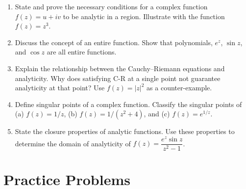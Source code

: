 \documentclass[12pt,a4paper]{article}
\begin{document}
\begin{enumerate}
  \item State and prove the necessary conditions for a complex function
        $f(z) = u + iv$ to be analytic in a region. Illustrate with the function
        $f(z) = z^{3}$.

  \item Discuss the concept of an entire function. Show that polynomials,
        $e^{z}$, $\sin z$, and $\cos z$ are all entire functions.

  \item Explain the relationship between the Cauchy--Riemann equations and
        analyticity. Why does satisfying C-R at a single point not guarantee
        analyticity at that point? Use $f(z) = |z|^{2}$ as a counter-example.

  \item Define singular points of a complex function. Classify the singular
        points of (a) $f(z) = 1/z$, (b) $f(z) = 1/(z^{2}+4)$, and
        (c) $f(z) = e^{1/z}$.

  \item State the closure properties of analytic functions. Use these properties
        to determine the domain of analyticity of
        $f(z) = \dfrac{e^{z}\sin z}{z^{2}-1}$.
\end{enumerate}

\section{Practice Problems}
\end{document}
